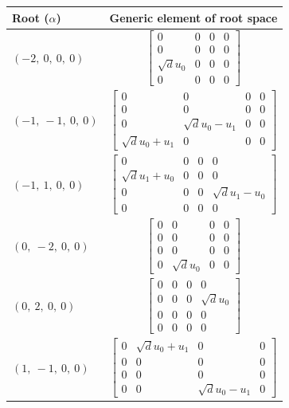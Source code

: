\documentclass[11pt]{article}
\theoremstyle{definition}
\begin{document}
\noindent \begin{tabular}{|l|c|}
    \hline
    \textbf{Root ($\alpha$)} & \textbf{Generic element of root space} \\
    \hline
    $\left( -2, \  0, \  0, \  0\right)$ & $\left[\begin{matrix}0 & 0 & 0 & 0\\0 & 0 & 0 & 0\\\sqrt{d} u_{0} & 0 & 0 & 0\\0 & 0 & 0 & 0\end{matrix}\right]$ \\
    \hline
    $\left( -1, \  -1, \  0, \  0\right)$ & $\left[\begin{matrix}0 & 0 & 0 & 0\\0 & 0 & 0 & 0\\0 & \sqrt{d} u_{0} - u_{1} & 0 & 0\\\sqrt{d} u_{0} + u_{1} & 0 & 0 & 0\end{matrix}\right]$ \\
    \hline
    $\left( -1, \  1, \  0, \  0\right)$ & $\left[\begin{matrix}0 & 0 & 0 & 0\\\sqrt{d} u_{1} + u_{0} & 0 & 0 & 0\\0 & 0 & 0 & \sqrt{d} u_{1} - u_{0}\\0 & 0 & 0 & 0\end{matrix}\right]$ \\
    \hline
    $\left( 0, \  -2, \  0, \  0\right)$ & $\left[\begin{matrix}0 & 0 & 0 & 0\\0 & 0 & 0 & 0\\0 & 0 & 0 & 0\\0 & \sqrt{d} u_{0} & 0 & 0\end{matrix}\right]$ \\
    \hline
    $\left( 0, \  2, \  0, \  0\right)$ & $\left[\begin{matrix}0 & 0 & 0 & 0\\0 & 0 & 0 & \sqrt{d} u_{0}\\0 & 0 & 0 & 0\\0 & 0 & 0 & 0\end{matrix}\right]$ \\
    \hline
    $\left( 1, \  -1, \  0, \  0\right)$ & $\left[\begin{matrix}0 & \sqrt{d} u_{0} + u_{1} & 0 & 0\\0 & 0 & 0 & 0\\0 & 0 & 0 & 0\\0 & 0 & \sqrt{d} u_{0} - u_{1} & 0\end{matrix}\right]$ \\

\end{tabular}
\end{document}
